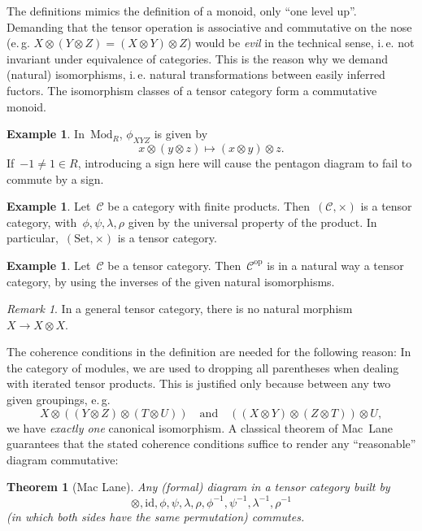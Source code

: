 \documentclass[a4paper,english,12pt]{scrartcl}
\theoremstyle{definition}
\newtheorem{ex}[defn]{Example}
\theoremstyle{plain}
\newtheorem{thm}[defn]{Theorem}
\theoremstyle{remark}
\newtheorem{rem}[defn]{Remark}
\newcommand{\C}{\mathcal{C}}
\newcommand{\id}{\mathrm{id}}
\newcommand{\op}{\mathrm{op}}
\renewcommand{\_}{\mathpunct{.}\,}
\newcommand{\?}{\,{:}\,}
\newcommand{\Mod}{\mathrm{Mod}}
\newcommand{\Set}{\mathrm{Set}}
\begin{document}
The definitions mimics the definition of a monoid, only ``one level up''.
Demanding that the tensor operation is associative and commutative on the nose
(e.\,g. $X \otimes (Y \otimes Z) = (X \otimes Y) \otimes Z$) would be
\emph{evil} in the technical sense, i.\,e. not invariant under equivalence of
categories. This is the reason why we demand (natural) isomorphisms, i.\,e.
natural transformations between easily inferred fuctors.
The isomorphism classes of a tensor category form a commutative monoid.

\begin{ex}In~$\Mod_R$, $\phi_{XYZ}$ is given by
\[ x \otimes (y \otimes z) \longmapsto (x \otimes y) \otimes z. \]
If~$-1 \neq 1 \in R$, introducing a sign here will cause the pentagon diagram
to fail to commute by a sign.\end{ex}

\begin{ex}Let~$\C$ be a category with finite products. Then~$(\C,\times)$ is a
tensor category, with~$\phi, \psi, \lambda, \rho$ given by the universal
property of the product. In particular,~$(\Set,\times)$ is a tensor
category.\end{ex}

\begin{ex}Let~$\C$ be a tensor category. Then~$\C^\op$ is in a natural way a
tensor category, by using the inverses of the given natural
isomorphisms.\end{ex}

\begin{rem}In a general tensor category, there is no natural morphism~$X \to X
\otimes X$.\end{rem}

The coherence conditions in the definition are needed for the following reason:
In the category of modules, we are used to dropping all parentheses when
dealing with iterated tensor products. This is justified only because between any
two given groupings, e.\,g.
\[ X \otimes ((Y \otimes Z) \otimes (T \otimes U)) \quad\text{and}\quad
  ((X \otimes Y) \otimes (Z \otimes T)) \otimes U, \]
we have \emph{exactly one} canonical isomorphism. A classical theorem of Mac~Lane
guarantees that the stated coherence conditions suffice to render any
``reasonable'' diagram commutative:

\begin{thm}[Mac Lane]Any (formal) diagram in a tensor category built
by \[
\otimes,\id,\phi,\psi,\lambda,\rho,\phi^{-1},\psi^{-1},\lambda^{-1},\rho^{-1}
\]
(in which both sides have the same permutation) commutes.\end{thm}
\end{document}
